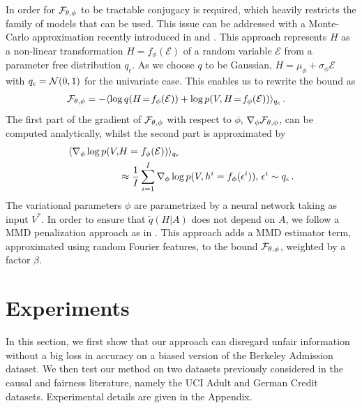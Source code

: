 \documentclass{article}
\newcommand{\av}[1]{\langle #1 \rangle}
\begin{document}
In order for ${\cal F}_{\theta,\phi}$ to be tractable conjugacy is required, which heavily restricts the family of models that can be used. 
This issue can be addressed with a Monte-Carlo approximation recently introduced in \citet{kingma14autoencoding} and \citet{rezende14stochastic}.
This approach represents $H$ as a non-linear transformation $H=f_{\phi}(\mathcal{E})$ of a random variable $\mathcal{E}$ from a parameter free distribution $q_{\epsilon}$.
As we choose $q$ to be Gaussian, $H=\mu_{\phi}+\sigma_{\phi}\mathcal{E}$ with $q_{\epsilon}={\cal N}(0,1)$ for the univariate case.
This enables us to rewrite the bound as
\begin{align*}
{\cal F_{\theta,\phi}}&=-\av{\log q(H\!=\!f_{\phi}(\mathcal{E}))+\log p(V,H\!=\!f_{\phi}(\mathcal{E}))}_{q_{\epsilon}}\,.
\end{align*}
The first part of the gradient of ${\cal F_{\theta,\phi}}$ with respect to $\phi$, $\nabla_{\phi}{\cal F_{\theta,\phi}}$,  can be computed analytically, whilst the second part is approximated by
\begin{align*}
\av{\nabla_{\phi} \log p(V,&H=f_{\phi}(\mathcal{E}))}_{q_{\epsilon}}\\ 
&\approx  \frac{1}{I}\sum_{i=1}^I \nabla_{\phi} \log p(V,h^i=f_{\phi}(\epsilon^i)) , \hskip0.05cm \epsilon^i\sim q_{\epsilon}\,.
\end{align*}
The variational parameters $\phi$ are parametrized by a neural network taking as input $V^*$. 
In order to ensure that $\tilde q(H|A)$ does not depend on $A$, we follow a MMD penalization approach as in \citet{louizos16fair}.
This approach adds a MMD estimator term, approximated using random Fourier features, to the bound ${\cal F_{\theta,\phi}}$, weighted by a factor $\beta$.

\section{Experiments}
In this section, we first show that our approach can disregard unfair information without a big loss in accuracy on a biased version of the Berkeley Admission dataset. 
We then test our method on two datasets previously considered in the causal and fairness literature, namely the UCI Adult and German Credit datasets. 
Experimental details are given in the Appendix.
\end{document}
